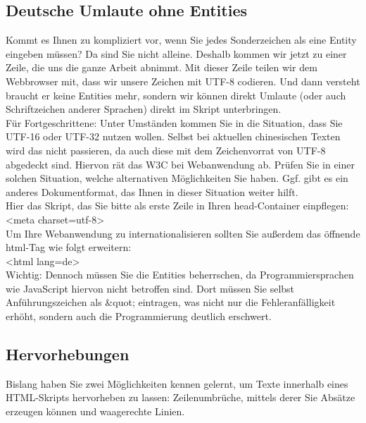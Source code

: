 \subsection{Deutsche Umlaute ohne Entities}

Kommt es Ihnen zu kompliziert vor, wenn Sie jedes Sonderzeichen als eine Entity eingeben müssen? Da sind Sie nicht alleine. Deshalb kommen wir jetzt zu einer Zeile, die uns die ganze Arbeit abnimmt. Mit dieser Zeile teilen wir dem Webbrowser mit, dass wir unsere Zeichen mit UTF-8 codieren. Und dann versteht braucht er keine Entities mehr, sondern wir können direkt Umlaute (oder auch Schriftzeichen anderer Sprachen) direkt im Skript unterbringen.\\

Für Fortgeschrittene: Unter Umständen kommen Sie in die Situation, dass Sie UTF-16 oder UTF-32 nutzen wollen. Selbst bei aktuellen chinesischen Texten wird das nicht passieren, da auch diese mit dem Zeichenvorrat von UTF-8 abgedeckt sind. Hiervon rät das W3C bei Webanwendung ab. Prüfen Sie in einer solchen Situation, welche alternativen Möglichkeiten Sie haben. Ggf. gibt es ein anderes Dokumentformat, das Ihnen in dieser Situation weiter hilft.\\

Hier das Skript, das Sie bitte als erste Zeile in Ihren head-Container einpflegen:\\

<meta charset=utf-8>\\

Um Ihre Webanwendung zu internationalisieren sollten Sie außerdem das öffnende html-Tag wie folgt erweitern:\\

<html lang=de>\\

Wichtig: Dennoch müssen Sie die Entities beherrschen, da Programmiersprachen wie JavaScript hiervon nicht betroffen sind. Dort müssen Sie selbst Anführungszeichen als \&quot; eintragen, was nicht nur die Fehleranfälligkeit erhöht, sondern auch die Programmierung deutlich erschwert.\\

\subsection{Hervorhebungen}

Bislang haben Sie zwei Möglichkeiten kennen gelernt, um Texte innerhalb eines HTML-Skripts hervorheben zu lassen: Zeilenumbrüche, mittels derer Sie Absätze erzeugen können und waagerechte Linien.\\

